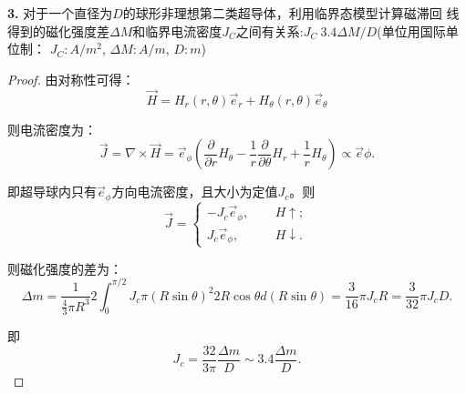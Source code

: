 \documentclass[reqno,a4paper,12pt]{amsart}
\begin{document}
\medskip

\textbf{3.} 对于一个直径为$D$的球形非理想第二类超导体，利用临界态模型计算磁滞回 线得到的磁化强度差$\Delta M$和临界电流密度$J_C$之间有关系:$J_C ~ 3.4\Delta M /D$(单位用国际单位制： $J_C:A/m^2$, $\Delta M:A/m$, $D:m$)

\begin{proof}
由对称性可得：
\[
	\vec{H} = H_r(r, \theta) \vec{e}_r + H_\theta(r, \theta) \vec{e}_\theta
\]

则电流密度为：
\[
	\vec{J} = \nabla \times \vec{H} = \vec{e}_\phi \left( \frac{\partial}{\partial r}H_\theta - \frac{1}{r}\frac{\partial}{\partial \theta} H_r + \frac{1}{r}H_\theta \right) \propto \vec{e}\phi.
\]

即超导球内只有$\vec{e}_\phi$方向电流密度，且大小为定值$J_c$。则
\[
	\vec{J} = \left\{ \begin{aligned}
		-J_c \vec{e}_\phi,& \ \ &H\uparrow; \\
		J_c \vec{e}_\phi,& \ \ &H\downarrow.
	\end{aligned} \right.
\]

则磁化强度的差为：
\[
	\Delta m = \frac{1}{\frac{4}{3}\pi R^3} 2 \int_0^{\pi/2} J_c \pi (R\sin\theta)^2 2R\cos\theta d(R\sin\theta) = \frac{3}{16}\pi J_c R = \frac{3}{32}\pi J_c D.
\]

即
\[
	J_c = \frac{32}{3\pi} \frac{\Delta m}{D} \sim 3.4\frac{\Delta m}{D}.
\]
\end{proof}
\end{document}
